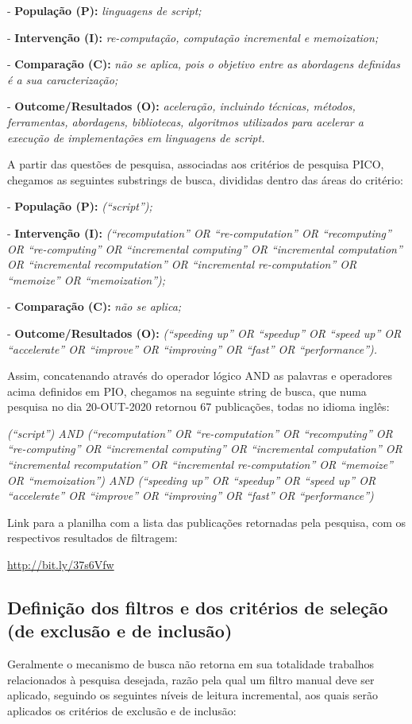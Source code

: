 \documentclass[sigconf]{acmart}
\begin{document}
- \textbf{População (P):} {\textit {linguagens de script;}}

- \textbf{Intervenção (I):} {\textit {re-computação, computação incremental e memoization;}}

- \textbf{Comparação (C):} {\textit {não se aplica, pois o objetivo entre as abordagens definidas é a sua caracterização;}}

- \textbf{Outcome/Resultados (O):} {\textit {aceleração, incluindo técnicas, métodos, ferramentas, abordagens, bibliotecas, algoritmos utilizados para acelerar a execução de implementações em linguagens de script.}}

A partir das questões de pesquisa, associadas aos critérios de pesquisa PICO, chegamos as seguintes substrings de busca, divididas dentro das áreas do critério: 

- \textbf{População (P):} {\textit {(“script”);}}

- \textbf{Intervenção (I):} {\textit {(“recomputation” OR “re-computation” OR “recomputing” OR “re-computing” OR “incremental computing” OR “incremental computation” OR “incremental recomputation” OR “incremental re-computation” OR “memoize” OR “memoization”);}}

- \textbf{Comparação (C):} {\textit {não se aplica;}}

- \textbf{Outcome/Resultados (O):} {\textit {(“speeding up” OR “speedup” OR “speed up” OR  “accelerate” OR “improve” OR “improving” OR “fast” OR “performance”).}}

Assim, concatenando através do operador lógico AND as palavras e operadores acima definidos em PIO, chegamos na seguinte string de busca, que numa pesquisa no dia 20-OUT-2020 retornou 67 publicações, todas no idioma inglês:

{\textit {(“script”) AND (“recomputation” OR “re-computation” OR “recomputing” OR “re-computing” OR “incremental computing” OR “incremental computation” OR “incremental recomputation” OR “incremental re-computation” OR “memoize” OR “memoization”) AND (“speeding up” OR “speedup” OR “speed up” OR “accelerate” OR “improve” OR “improving” OR “fast” OR “performance”)}}

Link para a planilha com a lista das publicações retornadas pela pesquisa, com os respectivos resultados de filtragem:

\url{http://bit.ly/37s6Vfw}


\subsection{Definição dos filtros e dos critérios de seleção (de exclusão e de inclusão)}
Geralmente o mecanismo de busca não retorna em sua totalidade trabalhos relacionados à pesquisa desejada, razão pela qual um filtro manual deve ser aplicado, seguindo os seguintes níveis de leitura incremental, aos quais serão aplicados os critérios de exclusão e de inclusão:
\end{document}

